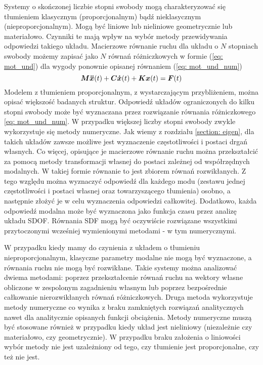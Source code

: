 Systemy o skończonej liczbie stopni swobody mogą charakteryzować się tłumieniem klasycznym (proporcjonalnym) bądź nieklasycznym (nieproporcjonalnym). Mogą być liniowe lub nieliniowe geometrycznie lub materiałowo. Czynniki te mają wpływ na wybór metody przewidywania odpowiedzi takiego układu. Macierzowe równanie ruchu dla układu o $N$ stopniach swobody możemy zapisać jako $N$ równań różniczkowych w formie (\ref{eq: mot_und}) dla wygody ponownie opisanej równaniem (\ref{eq: mot_und_num})
\begin{equation} \label{eq: mot_und_num}
	\bm{M} \bm{\ddot{x}}(t) +\bm{C} \bm{\dot{x}}(t)+ \bm{Kx}(t) = \bm{F}(t)
\end{equation}
 Modelem z tłumieniem proporcjonalnym, z wystarczającym przybliżeniem, można opisać większość badanych struktur. Odpowiedź układów ograniczonych do kilku stopni swobody może być wyznaczana przez rozwiązanie równania różniczkowego \ref{eq: mot_und_num}. W przypadku większej liczby stopni swobody zwykle wykorzystuje się metody numeryczne. Jak wiemy z rozdziału \ref{section: eigen}, dla takich układów zawsze możliwe jest wyznaczenie częstotliwości i postaci drgań własnych. Co więcej, opisujące je macierzowe równanie ruchu można przekształcić za pomocą metody transformacji własnej do postaci zależnej od współrzędnych modalnych. W takiej formie równanie to jest zbiorem równań rozwikłanych. Z tego względu można wyznaczyć odpowiedź dla każdego modu (zestawu jednej częstotliwości i postaci własnej oraz towarzyszącego tłumienia) osobno, a następnie złożyć je w celu wyznaczenia odpowiedzi całkowitej. Dodatkowo, każda odpowiedź modalna może być wyznaczona jako funkcja czasu przez analizę układu SDOF. Równania SDF mogą być oczywiście rozwiązane wszystkimi przytoczonymi wcześniej wymienionymi metodami - w tym numerycznymi.
 
 W przypadku kiedy mamy do czynienia z układem o tłumieniu nieproporcjonalnym, klasyczne parametry modalne nie mogą być wyznaczone, a równania ruchu nie mogą być rozwikłane. Takie systemy można analizować dwiema metodami: poprzez przekształcenie równań ruchu na wektory własne obliczone w zespolonym zagadnieniu własnym lub poprzez bezpośrednie całkowanie nierozwikłanych równań różniczkowych. Druga metoda wykorzystuje metody numeryczne co wynika z braku zamkniętych rozwiązań analitycznych nawet dla analitycznie opisanych funkcji obciążenia. Metody numeryczne muszą być stosowane również w przypadku kiedy układ jest nieliniowy (niezależnie czy materiałowo, czy geometrycznie). W przypadku braku założenia o liniowości wybór metody nie jest uzależniony od tego, czy tłumienie jest proporcjonalne, czy też nie jest.
 
